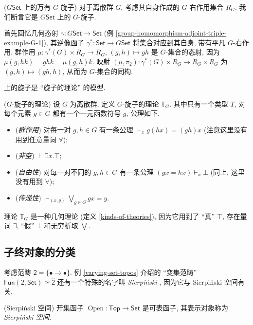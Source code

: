 \begin{example}
	{($G\mathsf {Set}$ 上的万有 $G$-旋子)}
	对于离散群 $G$, 考虑其自身作成的 $G$-右作用集合 $R_G$. 我们断言它是 $G\mathsf {Set}$ 上的 $G$-旋子.
	
	首先回忆几何态射 $\gamma\colon G\mathsf {Set} \to \mathsf {Set}$ (例 \ref{group-homomorphism-adjoint-triple-example-G-1}),
	其逆像函子 $\gamma^*\colon \mathsf {Set} \to G\mathsf {Set}$
	将集合对应到其自身, 带有平凡 $G$-右作用.
	群作用 $\mu\colon \gamma^*(G)\times R_G \to R_G$, $(g,h)\mapsto gh$ 是 $G$-集合的态射, 因为 $\mu(g,hk)=ghk=\mu(g,h)k$.
	映射 $(\mu,\pi_2)\colon \gamma^*(G)\times R_G\to R_G\times R_G$ 为 $(g,h)\mapsto (gh,h)$, 从而为 $G$-集合的同构.
\end{example}

\topos{}上的旋子是 ``旋子的理论'' 的模型.

\begin{definition}
	{($G$-旋子的理论)}
	设 $G$ 为离散群, 定义 $G$-旋子的理论 $\mathbb T_G$.
	其中只有一个类型 $T$, 对每个元素 $g\in G$ 都有一个一元函数符号 $g$, 公理如下.
	\begin{itemize}
		\item (\emph{群作用}) 对每一对 $g,h\in G$ 有一条公理 $\vdash_x g(hx)=(gh)x$ (注意这里没有用到任意量词 $\forall$);
		\item (\emph{非空}) $\vdash \exists x. \top$;
		\item (\emph{自由性}) 对每一对不同的 $g,h\in G$ 有一条公理 $(gx=hx)\vdash_x \bot$ (同上, 这里没有用到 $\forall$);
		\item (\emph{传递性}) $\displaystyle\vdash_{(x,y)}\bigvee_{g\in G}gx=y$.
	\end{itemize}
\end{definition}

理论 $\mathbb T_G$ 是一种几何理论 (定义 \ref{kinds-of-theories}), 因为它用到了 ``真'' $\top$, 存在量词 $\exists$, ``假'' $\bot$ 和无穷析取 $\bigvee$.

\subsection{子终对象的分类\topos}

考虑范畴 $\mathsf 2 = \{\bullet\longrightarrow\bullet\}$. 例 \ref{varying-set-topos} 介绍的 ``变集范畴'' $\mathsf {Fun}(\mathsf {2},\mathsf {Set})\simeq\widehat {\mathsf {2}}$ 还有一个特殊的名字叫 \emph{Sierpi\'nski \topos{}}, 因为它与 Sierpi\'nski 空间有关.

\begin{propdef}
	[label={Sierpinski-space}]
	{(Sierpi\'nski 空间)}
	开集函子 $\operatorname{Open}\colon \mathsf {Top}\to \mathsf {Set}$ 是可表函子, 其表示对象称为 \emph{Sierpi\'nski 空间}.
\end{propdef}

